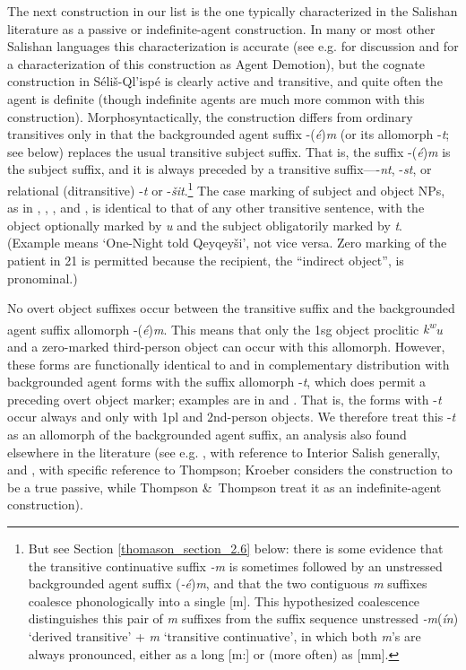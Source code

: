 \documentclass[output=paper,colorlinks,citecolor=brown]{langscibook}
\begin{document}
The next construction in our list is the one typically characterized
in the Salishan literature as a passive or indefinite-agent
construction.  In many or most other Salishan languages this
characterization is accurate (see e.g. \citealt[25--28]{Kroeber:1999} for
discussion and for a characterization of this construction as Agent
Demotion), but the cognate construction in S\'eli\v{s}-Ql'isp\'e is
clearly active and transitive, and quite often the agent is definite
(though indefinite agents are much more common with this
construction).  Morphosyntactically, the construction differs from
ordinary transitives only in that the backgrounded agent suffix -(\emph{\'e})\emph{m} (or its allomorph -\emph{t}; see below) replaces the
usual transitive subject suffix.  That is, the suffix -(\emph{\'e})\emph{m} is the subject suffix, and it is always preceded by a transitive
suffix---{-\emph{nt}}, -\emph{st}, or relational (ditransitive) -\emph{{\textltilde}t} or -\emph{\v{s}it}.\footnote{But see Section \ref{thomason_section_2.6} below:
there is some evidence that the transitive continuative suffix \emph{-m} is sometimes followed by an unstressed backgrounded agent suffix
(\emph{-\'e})\emph{m}, and that the two contiguous \emph{m} suffixes
coalesce phonologically into a single [m].  This hypothesized
coalescence distinguishes this pair of \emph{m} suffixes from the
suffix sequence unstressed \emph{-m}(\emph{\'in}) `derived transitive' +
\emph{m} `transitive continuative', in which both \emph{m}'s are always
pronounced, either as a long [m:] or (more often) as [m{\textschwa}m].
} The case marking of subject and object NPs, as in , , , and
, is identical to that of any other transitive sentence, with the
object optionally marked by \emph{{\textltilde}u} and the subject
obligatorily marked by \emph{t}.  (Example  means `One-Night told
Qeyqey\v{s}i', not vice versa.  Zero marking of the patient in 21 is
permitted because the recipient, the ``indirect object'', is
pronominal.)


No overt object suffixes occur between the transitive suffix and the
background\-ed agent suffix allomorph -(\emph{\'e})\emph{m}.  This means
that only the 1sg object proclitic \emph{{k\textsuperscript w}u} and a
zero-marked third-person object can occur with this allomorph.
However, these forms are functionally identical to and in
complementary distribution with backgrounded agent forms with the
suffix allomorph -\emph{t}, which does permit a preceding overt object
marker; examples are in  and .  That is, the forms with -\emph{t}
occur always and only with 1pl and 2nd-person objects.  We therefore
treat this -\emph{t} as an allomorph of the backgrounded agent suffix,
an analysis also found elsewhere in the literature (see
e.g. \citealt[25--28]{Kroeber:1999}, with reference to Interior
Salish generally, and \citealt[63]{Thompson&Thompson:1992}, with specific
reference to Thompson; Kroeber considers the construction to be a true
passive, while Thompson \&\ Thompson treat it as an indefinite-agent
construction).
\end{document}
